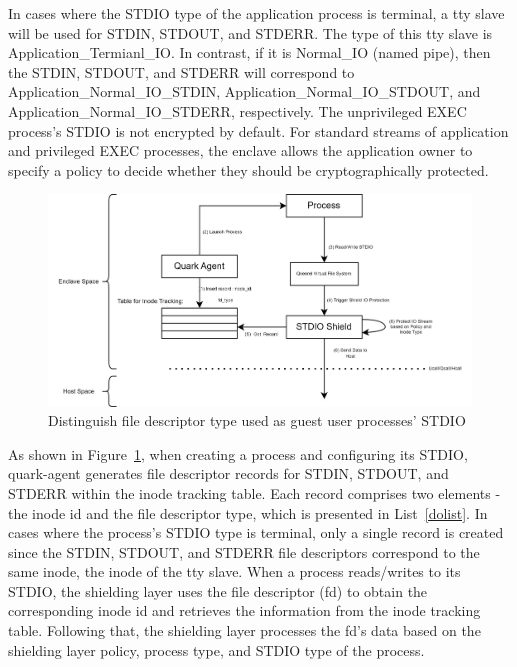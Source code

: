 In cases where the STDIO type of the application process is terminal, a tty slave will be used for STDIN, STDOUT, and STDERR. The type of this tty slave is Application\_Termianl\_IO.  In contrast, if it is Normal\_IO (named pipe), then the STDIN, 
STDOUT, and STDERR will correspond to Application\_Normal\_IO\_STDIN, Application\_Normal\_IO\_STDOUT, and Application\_Normal\_IO\_STDERR, respectively. The unprivileged EXEC process's STDIO is not encrypted by default. For standard streams of 
application and privileged EXEC processes, the enclave allows the application owner to specify a policy to decide whether they should be cryptographically protected.
\begin{figure}[H]
    \centering
    \includegraphics[scale=0.5]{images/differenciate_fds.png}
    \caption[Distinguish file descriptor type used as guest user processes' STDIO]{Distinguish file descriptor type used as guest user processes' STDIO}
    \label{fig:differenciate_fds}
\end{figure}

As shown in Figure~\ref{fig:differenciate_fds}, when creating a process and configuring its STDIO, quark-agent generates file descriptor records for STDIN, STDOUT, and  STDERR within the inode tracking table. Each record comprises two elements - the inode id and the file descriptor type, which 
is presented in List~\ref{dolist}. In cases where the process's STDIO type is terminal, only a single record is created since the STDIN, STDOUT, and STDERR file descriptors correspond to the same inode, the inode of the tty slave. When a process 
reads/writes to its STDIO, the shielding layer uses the file descriptor (fd) to obtain the corresponding inode id and retrieves the information from the inode tracking table. Following that, the shielding layer processes the fd’s data based on the 
shielding layer policy, process type, and STDIO type of the process.
  
